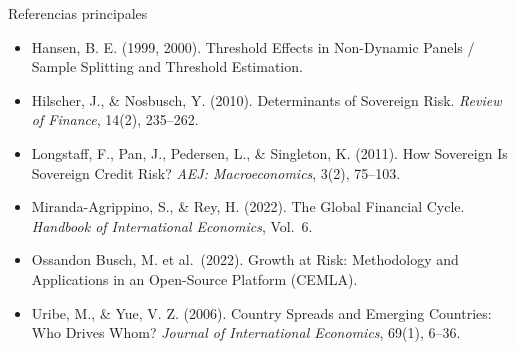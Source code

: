 \documentclass[aspectratio=169]{beamer}
\begin{document}
\begin{frame}[allowframebreaks]{Referencias principales}
\begin{itemize}
\item Hansen, B. E. (1999, 2000). Threshold Effects in Non-Dynamic Panels / Sample Splitting and Threshold Estimation.
\item Hilscher, J., \& Nosbusch, Y. (2010). Determinants of Sovereign Risk. \textit{Review of Finance}, 14(2), 235--262.
\item Longstaff, F., Pan, J., Pedersen, L., \& Singleton, K. (2011). How Sovereign Is Sovereign Credit Risk? \textit{AEJ: Macroeconomics}, 3(2), 75--103.
\item Miranda-Agrippino, S., \& Rey, H. (2022). The Global Financial Cycle. \textit{Handbook of International Economics}, Vol.\ 6.
\item Ossandon Busch, M. et al.\ (2022). Growth at Risk: Methodology and Applications in an Open-Source Platform (CEMLA).
\item Uribe, M., \& Yue, V. Z. (2006). Country Spreads and Emerging Countries: Who Drives Whom? \textit{Journal of International Economics}, 69(1), 6--36.
\end{itemize}
\end{frame}
\end{document}
